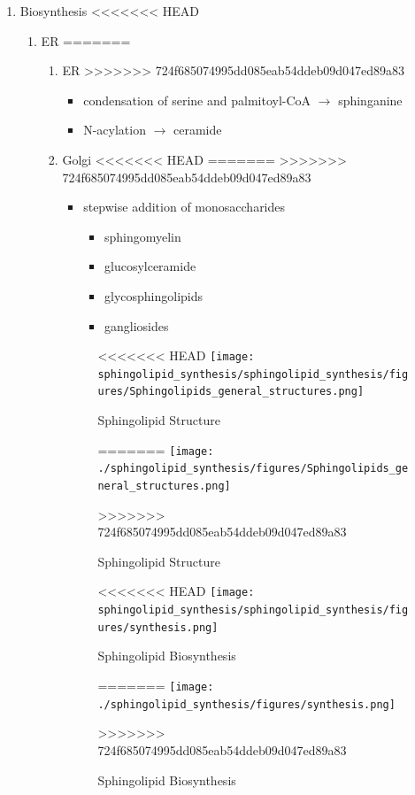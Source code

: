 \documentclass[fontsize=12pt]{scrartcl}
\begin{document}
\begin{enumerate}
\begin{enumerate}
\item Biosynthesis
<<<<<<< HEAD
\label{sec:org0ad627e}
\begin{enumerate}
\item ER
\label{sec:org5d6ea58}
=======
\label{sec:orga7eaf97}
\begin{enumerate}
\item ER
\label{sec:org3136937}
>>>>>>> 724f685074995dd085eab54ddeb09d047ed89a83
\begin{itemize}
\item condensation of serine and palmitoyl-CoA \(\to\) sphinganine
\item N-acylation \(\to\) ceramide
\end{itemize}

\item Golgi
<<<<<<< HEAD
\label{sec:orgbff386e}
=======
\label{sec:orgcf0e4d3}
>>>>>>> 724f685074995dd085eab54ddeb09d047ed89a83
\begin{itemize}
\item stepwise addition of monosaccharides
\begin{itemize}
\item sphingomyelin
\item glucosylceramide
\item glycosphingolipids
\item gangliosides
\end{itemize}
\end{itemize}


\begin{figure}[htbp]
\centering
<<<<<<< HEAD
\texttt{[image: sphingolipid\_synthesis/sphingolipid\_synthesis/figures/Sphingolipids\_general\_structures.png]}
\caption[Sphingolipid Structure]{\label{fig:orgcb1f6ac}Sphingolipid Structure}
=======
\texttt{[image: ./sphingolipid\_synthesis/figures/Sphingolipids\_general\_structures.png]}
\caption[Sphingolipid Structure]{\label{fig:org242357d}
Sphingolipid Structure}
>>>>>>> 724f685074995dd085eab54ddeb09d047ed89a83
\end{figure}


\begin{figure}[htbp]
\centering
<<<<<<< HEAD
\texttt{[image: sphingolipid\_synthesis/sphingolipid\_synthesis/figures/synthesis.png]}
\caption[Sphingolipid Biosynthesis]{\label{fig:org0f3037f}Sphingolipid Biosynthesis}
=======
\texttt{[image: ./sphingolipid\_synthesis/figures/synthesis.png]}
\caption[Sphingolipid Biosynthesis]{\label{fig:org65d519f}
Sphingolipid Biosynthesis}
>>>>>>> 724f685074995dd085eab54ddeb09d047ed89a83
\end{figure}
\end{enumerate}
\end{enumerate}


\end{enumerate}
\end{enumerate}
\end{document}
